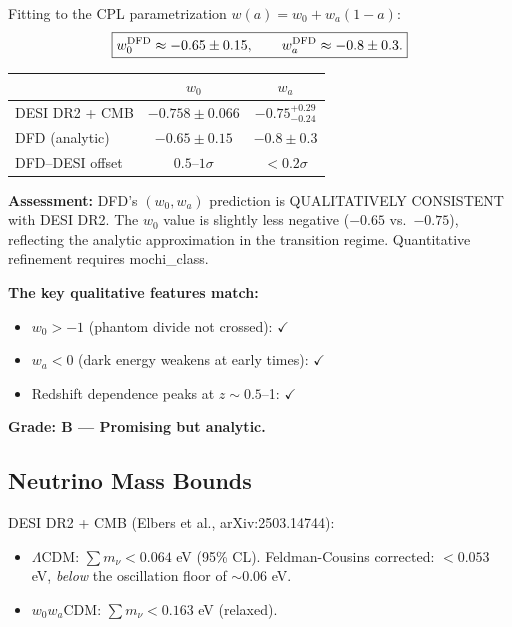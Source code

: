 \documentclass[11pt]{article}
\newcommand{\LCDM}{$\Lambda$CDM}
\begin{document}
Fitting to the CPL parametrization $w(a) = w_0 + w_a(1-a)$:
\begin{equation}
  \boxed{w_0^{\rm DFD} \approx -0.65 \pm 0.15, \qquad w_a^{\rm DFD} \approx -0.8 \pm 0.3.}
\end{equation}

\begin{tcolorbox}[colback=orange!5!white, colframe=orange!70!black,
  title=\textbf{DFD vs.\ DESI DR2: $(w_0, w_a)$ Comparison}]

\begin{center}
\begin{tabular}{lcc}
\toprule
 & $w_0$ & $w_a$ \\
\midrule
DESI DR2 + CMB & $-0.758 \pm 0.066$ & $-0.75^{+0.29}_{-0.24}$ \\
DFD (analytic) & $-0.65 \pm 0.15$ & $-0.8 \pm 0.3$ \\
DFD--DESI offset & $0.5$--$1\sigma$ & $< 0.2\sigma$ \\
\bottomrule
\end{tabular}
\end{center}

\textbf{Assessment:} DFD's $(w_0, w_a)$ prediction is
QUALITATIVELY CONSISTENT with DESI DR2. The $w_0$ value is
slightly less negative ($-0.65$ vs.\ $-0.75$), reflecting
the analytic approximation in the transition regime. Quantitative
refinement requires mochi\_class.

\textbf{The key qualitative features match:}
\begin{itemize}
  \item $w_0 > -1$ (phantom divide not crossed): $\checkmark$
  \item $w_a < 0$ (dark energy weakens at early times): $\checkmark$
  \item Redshift dependence peaks at $z \sim 0.5$--1: $\checkmark$
\end{itemize}

\textbf{Grade: B --- Promising but analytic.}

\end{tcolorbox}

\subsection{Neutrino Mass Bounds}

DESI DR2 + CMB (Elbers et al., arXiv:2503.14744):
\begin{itemize}
  \item \LCDM: $\sum m_\nu < 0.064$ eV (95\% CL).
    Feldman-Cousins corrected: $< 0.053$ eV, \emph{below} the
    oscillation floor of $\sim 0.06$ eV.
  \item $w_0w_a$CDM: $\sum m_\nu < 0.163$ eV (relaxed).
\end{itemize}
\end{document}
